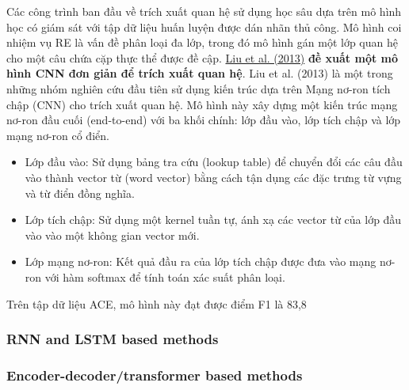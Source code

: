 \begin{singlespace}
Các công trình ban đầu về trích xuất quan hệ sử dụng học sâu dựa trên mô hình học có giám sát
với tập dữ liệu huấn luyện được dán nhãn thủ công. Mô hình coi nhiệm vụ RE là vấn đề phân loại
đa lớp, trong đó mô hình gán một lớp quan hệ cho một câu chứa cặp thực thể được đề cập.
\href{https://scholar.google.com/scholar_lookup?title=Convolution%20neural%20network%20for%20relation%20extraction&publication_year=2013&author=C.%20Liu&author=W.%20Sun&author=W.%20Chao&author=W.%20Che}{Liu et al. (2013)} \textbf{đề xuất một mô hình CNN đơn giản để trích xuất quan hệ}.
Liu et al. (2013) là một trong những nhóm nghiên cứu đầu tiên sử dụng kiến trúc dựa trên Mạng nơ-ron tích chập (CNN) cho trích xuất quan hệ. Mô hình này xây dựng một kiến trúc mạng nơ-ron đầu cuối (end-to-end) với ba khối chính: lớp đầu vào, lớp tích chập và lớp mạng nơ-ron cổ điển.
\begin{itemize}
\item Lớp đầu vào: Sử dụng bảng tra cứu (lookup table) để chuyển đổi các câu đầu vào thành vector từ (word vector) bằng cách tận dụng các đặc trưng từ vựng và từ điển đồng nghĩa.
\item Lớp tích chập: Sử dụng một kernel tuần tự, ánh xạ các vector từ của lớp đầu vào vào một không gian vector mới.
\item Lớp mạng nơ-ron: Kết quả đầu ra của lớp tích chập được đưa vào mạng nơ-ron với hàm softmax để tính toán xác suất phân loại.
\end{itemize}
Trên tập dữ liệu ACE, mô hình này đạt được điểm F1 là 83,8%
\end{singlespace}
































\subsubsection{RNN and LSTM based methods}
\subsubsection{Encoder-decoder/transformer based methods}
